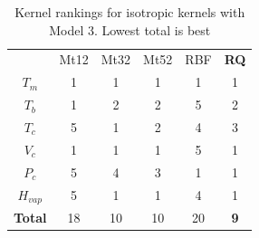 \documentclass[journal=jacsat,manuscript=article]{achemso}
\begin{document}
\begin{table}
    \centering
    \begin{tabular}{cccccc}
         &  Mt12&  Mt32&  Mt52&  RBF& \textbf{RQ}
\\
        $T_m$ &  1&  1&  1&  1& 1
\\
         $T_b$ &  1&  2&  2&  5& 2
\\
         $T_c$  &  5&  1&  2&  4& 3
\\
         $V_c$  &  1&  1&  1&  5& 1
\\
         $P_c$ &  5&  4&  3&  1& 1
\\
         $H_{vap}$ &  5&  1&  1&  4& 1
\\
         \textbf{Total} &  18&  10&  10&  20& \textbf{9}
\\
    \end{tabular}
    \caption{Kernel rankings for isotropic kernels with Model 3. Lowest total is best}
    \label{tab:kernel_comparisons}
\end{table}




\end{document}
